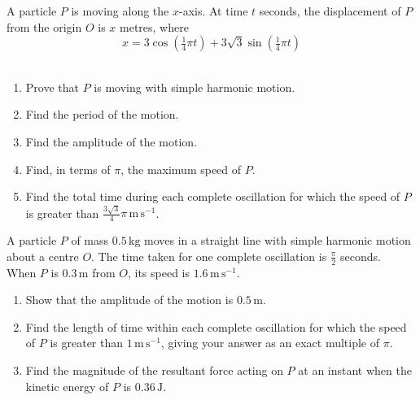 \documentclass[leqno]{article}
\begin{document}
\djsFrontMatter
\begin{enumerate}[
  label=\textbf{\arabic*.},
  leftmargin=*,
  topsep=0pt,
  partopsep=0pt,
  parsep=0pt
]

\questionitem

A particle $P$ is moving along the $x$-axis. At time $t$ seconds, the displacement of $P$ from the origin $O$ is $x$ metres, where
\[
x = 3\cos\left(\tfrac{1}{4}\pi t\right) + 3\sqrt{3}\sin\left(\tfrac{1}{4}\pi t\right)
\]
\\
\begin{enumerate}[label=\textbf{(\alph*)}]
\item Prove that $P$ is moving with simple harmonic motion.  \\
\item Find the period of the motion.  \\
\item Find the amplitude of the motion.  \\
\item Find, in terms of $\pi$, the maximum speed of $P$.  \\
\item Find the total time during each complete oscillation for which the speed of $P$ is greater than $\frac{3\sqrt{3}}{4}\pi\,\mathrm{m\,s^{-1}}$.  \\
\end{enumerate}

\newpage

\questionitem

A particle $P$ of mass $0.5\,\mathrm{kg}$ moves in a straight line with simple harmonic motion about a centre $O$. The time taken for one complete oscillation is $\frac{\pi}{2}$ seconds. \\
When $P$ is $0.3\,\mathrm{m}$ from $O$, its speed is $1.6\,\mathrm{m\,s^{-1}}$. \\
\begin{enumerate}[label=\textbf{(\alph*)}]
\item Show that the amplitude of the motion is $0.5\,\mathrm{m}$.  \\
\item Find the length of time within each complete oscillation for which the speed of $P$ is greater than $1\,\mathrm{m\,s^{-1}}$, giving your answer as an exact multiple of $\pi$.  \\
\item Find the magnitude of the resultant force acting on $P$ at an instant when the kinetic energy of $P$ is $0.36\,\mathrm{J}$.  \\
\end{enumerate}


\end{enumerate}
\end{document}
